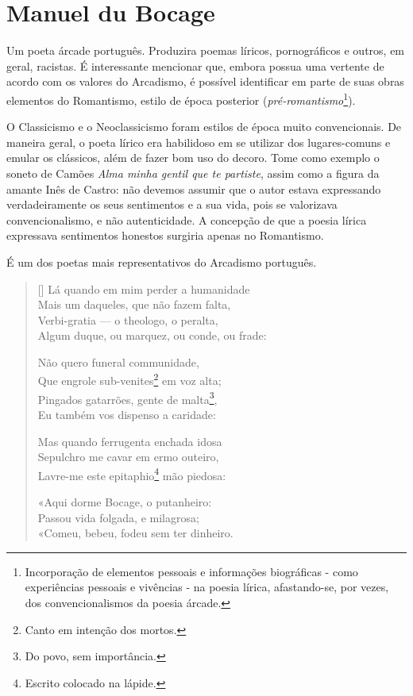 \documentclass[12pt]{book}
\begin{document}
			\section{Manuel du Bocage}
			\par Um poeta árcade português. Produzira poemas líricos, pornográficos e outros, em geral, racistas. É interessante mencionar que, embora possua uma vertente de acordo com os valores do Arcadismo, é possível identificar em parte de suas obras elementos do Romantismo, estilo de época posterior (\textit{pré-romantismo}\footnote{Incorporação de elementos pessoais e informações biográficas - como experiências pessoais e vivências - na poesia lírica, afastando-se, por vezes, dos convencionalismos da poesia árcade.}).
			\par O Classicismo e o Neoclassicismo foram estilos de época muito convencionais. De maneira geral, o poeta lírico era habilidoso em se utilizar dos lugares-comuns e emular os clássicos, além de fazer bom uso do decoro. Tome como exemplo o soneto de Camões \textit{Alma minha gentil que te partiste}, assim como a figura da amante Inês de Castro: não devemos assumir que o autor estava expressando verdadeiramente os seus sentimentos e a sua vida, pois se valorizava convencionalismo, e não autenticidade. A concepção de que a poesia lírica expressava sentimentos honestos surgiria apenas no Romantismo.
			\par É um dos poetas mais representativos do Arcadismo português.
			\settowidth{\versewidth}{Mais um daqueles, que não fazem falta,}
			\begin{verse}[\versewidth]
				Lá quando em mim perder a humanidade \\
				Mais um daqueles, que não fazem falta, \\
				Verbi-gratia — o theologo, o peralta, \\
				Algum duque, ou marquez, ou conde, ou frade:
				
				Não quero funeral communidade, \\
				Que engrole sub-venites\footnote{Canto em intenção dos mortos.} em voz alta; \\
				Pingados gatarrões, gente de malta\footnote{Do povo, sem importância.}, \\
				Eu também vos dispenso a caridade:
				
				Mas quando ferrugenta enchada idosa \\
				Sepulchro me cavar em ermo outeiro, \\
				Lavre-me este epitaphio\footnote{Escrito colocado na lápide.} mão piedosa:
				
				«Aqui dorme Bocage, o putanheiro: \\
				Passou vida folgada, e milagrosa; \\
				«Comeu, bebeu, fodeu sem ter dinheiro.
			\end{verse}
\end{document}
